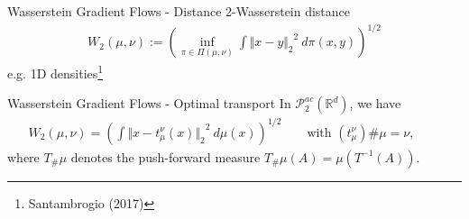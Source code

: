 \documentclass[aspectratio=149]{beamer}
\def\real{\mathbb{R}}
\newcommand{\norm}[2]{\ensuremath{\Vert #1 \Vert_{#2}}}
\begin{document}
\begin{frame}{Wasserstein Gradient Flows - Distance}
2-Wasserstein distance
\begin{align*}
W_{2}(\mu,\nu):=\left(\inf_{\pi\in\Pi(\mu,\nu)}\int\norm{x-y}{2}^{2}\ d\pi(x,y)\right)^{1/2}
\end{align*}
\pause
e.g. 1D densities\footnote{Santambrogio (2017)}
\begin{figure}
\centering
{}
\end{figure}

\end{frame}

\begin{frame}{Wasserstein Gradient Flows - Optimal transport}
In $\mathcal{P}_{2}^{ac}(\real^{d})$, we have
\begin{align*}
W_{2}(\mu,\nu)=\left(\int\norm{x-t_{\mu}^{\nu}(x)}{2}^{2}\ d\mu(x)\right)^{1/2} \qquad\text{with } (t_{\mu}^{\nu}){\#}\mu=\nu,\qquad 
\end{align*}
where $T_{\#}\mu$ denotes the push-forward measure $T_{\#}\mu(A)=\mu(T^{-1}(A))$.
\end{frame}
\end{document}

